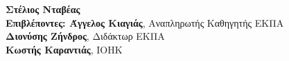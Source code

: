 \begin{center}
    \textbf{\large Στέλιος Νταβέας} \\
    \vspace{2.5cm}
    \textbf{\large Επιβλέποντες: Άγγελος Κιαγιάς}\large , Αναπληρωτής Καθηγητής ΕΚΠΑ\\
    \hspace{0.82cm}
    \textbf{\large Διονύσης Ζήνδρος}\large, Διδάκτωρ ΕΚΠΑ\\
    \hspace{-1.15cm}
    \textbf{\large Κωστής Καραντιάς}\large, IOHK
    \vspace{2cm}

    \date{Αθήνα, \\ Ιούνιος 2020}
    \pagebreak
\end{center}
